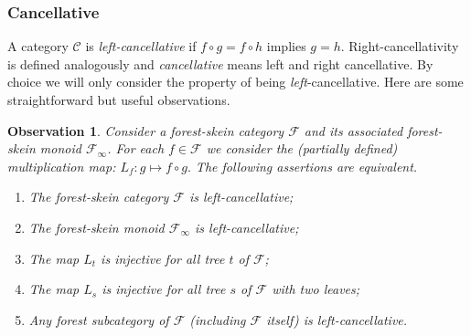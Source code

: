 \documentclass[a4paper, 12pt]{amsart}
\numberwithin{equation}{section}
\newtheorem{observation}[theorem]{Observation}
\theoremstyle{definition}
\newcommand{\cC}{\mathcal C}
\newcommand{\cF}{\mathcal F}
\begin{document}
\subsubsection{Cancellative}

A category $\cC$ is {\it left-cancellative} if $f\circ g=f\circ h$ implies $g=h$. 
Right-cancellativity is defined analogously and {\it cancellative} means left and right cancellative.
By choice we will only consider the property of being {\it left}-cancellative.
Here are some straightforward but useful observations.

\begin{observation}\label{obs:LC}
Consider a forest-skein category $\cF$ and its associated forest-skein monoid $\cF_\infty$.
For each $f\in\cF$ we consider the (partially defined) multiplication map:
$L_f: g\mapsto f\circ g.$
The following assertions are equivalent.
\begin{enumerate}
\item The forest-skein category $\cF$ is left-cancellative;
\item The forest-skein monoid $\cF_\infty$ is left-cancellative;
\item The map $L_t$ is injective for all tree $t$ of $\cF$;
\item The map $L_s$ is injective for all tree $s$ of $\cF$ with two leaves;
\item Any forest subcategory of $\cF$ (including $\cF$ itself) is left-cancellative.
\end{enumerate}
\end{observation}
\end{document}
